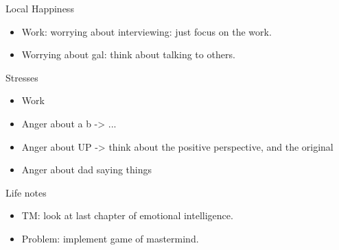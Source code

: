 \begin{frame}
  \begin{columns}
    \begin{column}{0.25\linewidth} %
      \begin{block}{Local Happiness}
        \begin{itemize}
          \tiny \item \tiny Work: worrying about interviewing: just focus on the work. 
        \item \tiny Worrying about gal: think about talking to others. 
        \end{itemize}
      \end{block}
      \begin{block}{Stresses}
        \begin{itemize}
          \tiny \item \tiny Work 
          \item \tiny Anger about a b  -> ...
          \item \tiny Anger about UP -> think about the positive
            perspective, and the original
          \item \tiny Anger about dad saying things 
        \end{itemize}
      \end{block}    
      \begin{block}{Life notes}
        \begin{itemize}
        \item \tiny TM: look at last chapter of emotional
          intelligence.  
        \item \tiny Problem: implement game of mastermind. 
        \end{itemize}
      \end{block}
    \end{column} %

    \begin{column}{0.50\linewidth}


\end{column}
\end{columns}
\end{frame}
